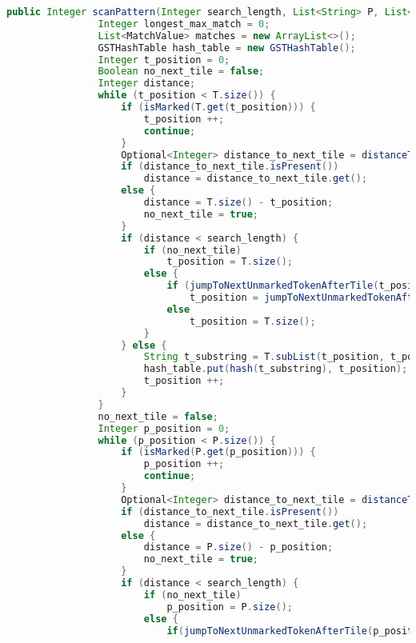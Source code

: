 \begin{lstlisting}[language=java]
            public Integer scanPattern(Integer search_length, List<String> P, List<String> T) {
                Integer longest_max_match = 0;
                List<MatchValue> matches = new ArrayList<>();
                GSTHashTable hash_table = new GSTHashTable();
                Integer t_position = 0;
                Boolean no_next_tile = false;
                Integer distance;
                while (t_position < T.size()) {
                    if (isMarked(T.get(t_position))) {
                        t_position ++;
                        continue;
                    }
                    Optional<Integer> distance_to_next_tile = distanceToNextTile(t_position, T);
                    if (distance_to_next_tile.isPresent())
                        distance = distance_to_next_tile.get();
                    else {
                        distance = T.size() - t_position;
                        no_next_tile = true;
                    }
                    if (distance < search_length) {
                        if (no_next_tile)
                            t_position = T.size();
                        else {
                            if (jumpToNextUnmarkedTokenAfterTile(t_position, T).isPresent())
                                t_position = jumpToNextUnmarkedTokenAfterTile(t_position, T).get();
                            else
                                t_position = T.size();
                        }
                    } else {
                        String t_substring = T.subList(t_position, t_position + search_length).stream().collect(Collectors.joining());
                        hash_table.put(hash(t_substring), t_position);
                        t_position ++;
                    }
                }
                no_next_tile = false;
                Integer p_position = 0;
                while (p_position < P.size()) {
                    if (isMarked(P.get(p_position))) {
                        p_position ++;
                        continue;
                    }
                    Optional<Integer> distance_to_next_tile = distanceToNextTile(p_position, P);
                    if (distance_to_next_tile.isPresent())
                        distance = distance_to_next_tile.get();
                    else {
                        distance = P.size() - p_position;
                        no_next_tile = true;
                    }
                    if (distance < search_length) {
                        if (no_next_tile)
                            p_position = P.size();
                        else {
                            if(jumpToNextUnmarkedTokenAfterTile(p_position, P).isPresent())

\end{lstlisting}

